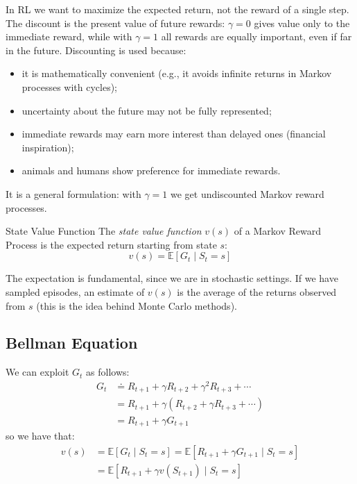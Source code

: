 In RL we want to maximize the expected return, not the reward of a single step. The discount is the present value of future rewards: $\gamma=0$ gives value only to the immediate reward, while with $\gamma=1$ all rewards are equally important, even if far in the future. Discounting is used because:
\begin{itemize}
    \item it is mathematically convenient (e.g., it avoids infinite returns in Markov processes with cycles);
    \item uncertainty about the future may not be fully represented;
    \item immediate rewards may earn more interest than delayed ones (financial inspiration);
    \item animals and humans show preference for immediate rewards.
\end{itemize}
It is a general formulation: with $\gamma=1$ we get undiscounted Markov reward processes.

\begin{defbox}{State Value Function}
    The \textit{state value function} $v(s)$ of a Markov Reward Process is the expected return starting from state $s$:
    \[v(s)=\mathbb{E}[G_t\mid S_t=s]\]
\end{defbox}
The expectation is fundamental, since we are in stochastic settings. If we have sampled episodes, an estimate of $v(s)$ is the average of the returns observed from $s$ (this is the idea behind Monte Carlo methods).

\subsection{Bellman Equation}
We can exploit $G_t$ as follows:
\begin{equation}
\begin{split}
  G_t &\doteq R_{t+1} + \gamma R_{t+2} + \gamma^2 R_{t+3} + \cdots \\
      &= R_{t+1} + \gamma \left( R_{t+2} + \gamma R_{t+3} + \cdots \right) \\
      &= R_{t+1} + \gamma G_{t+1}
\end{split}
\end{equation}
so we have that: 
\begin{equation}
    \begin{split}
        v(s) &= \mathbb{E}[G_t\mid S_t=s] = \mathbb{E}[R_{t+1} + \gamma G_{t+1}\mid S_t=s] \\
        &= \mathbb{E}[R_{t+1}+\gamma v(S_{t+1})\mid S_t=s]
    \end{split}
\end{equation}

